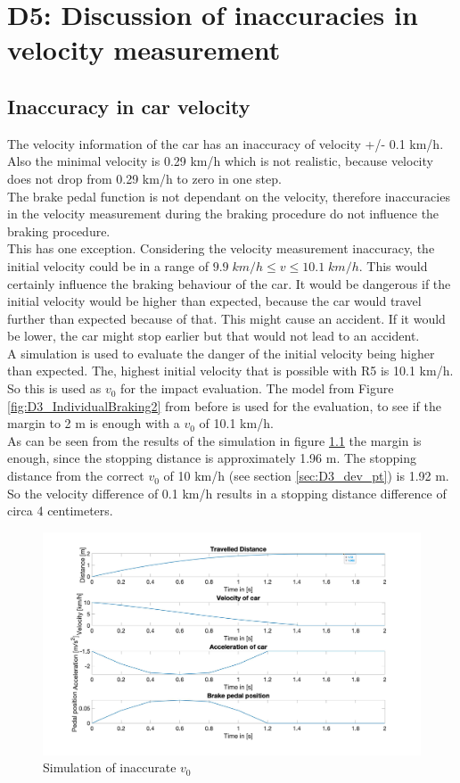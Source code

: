 \chapter{D5: Discussion of inaccuracies in velocity measurement}\label{cha:D5}
\section{Inaccuracy in car velocity}
The velocity information of the car has an inaccuracy of velocity +/- 0.1 km/h.
Also the minimal velocity is 0.29 km/h which is not realistic, because velocity does not drop from 0.29 km/h to zero in one step.\\
The brake pedal function is not dependant on the velocity, therefore inaccuracies in the velocity measurement during the braking procedure do not influence the braking procedure.\\
This has one exception.
Considering the velocity measurement inaccuracy, the initial velocity could be in a range of $9.9\; km/h \leq v  \leq 10.1\; km/h$.
This would certainly influence the braking behaviour of the car.
It would be dangerous if the initial velocity would be higher than expected, because the car would travel further than expected because of that.
This might cause an accident.
If it would be lower, the car might stop earlier but that would not lead to an accident.\\
A simulation is used to evaluate the danger of the initial velocity being higher than expected.
The, highest initial velocity that is possible with R5 is 10.1 km/h.
So this is used as $v_0$ for the impact evaluation.
The model from Figure \ref{fig:D3_IndividualBraking2} from before is used for the evaluation, to see if the margin to 2 m is enough with a $v_0$ of 10.1 km/h.\\
As can be seen from the results of the simulation in figure \ref{fig:D5_results} the margin is enough, since the stopping distance is approximately 1.96 m.
The stopping distance from the correct $v_0$ of 10 km/h (see section \ref{sec:D3_dev_pt}) is 1.92 m. So the velocity difference of 0.1 km/h results in a stopping distance difference of circa 4 centimeters.

\begin{figure}[H]
\centering
\includegraphics[width=1\textwidth]{images/D5_result.jpg}
\caption{Simulation of inaccurate $v_0$}
\label{fig:D5_results}
\end{figure}

